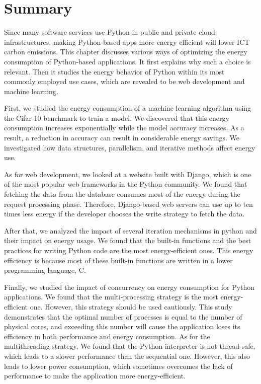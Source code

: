 \section{Summary}

Since many software services use Python in public and private cloud infrastructures, making Python-based apps more energy efficient will lower ICT carbon emissions.
This chapter discusses various ways of optimizing the energy consumption of Python-based applications. It first explains why such a choice is relevant. Then it studies the energy behavior of Python within its most commonly employed use cases, which are revealed to be web development and machine learning.

First, we studied the energy consumption of a machine learning algorithm using the Cifar-10 benchmark to train a model. We discovered that this energy consumption increases exponentially while the model accuracy increases.
As a result, a reduction in accuracy can result in considerable energy savings.
We investigated how data structures, parallelism, and iterative methods affect energy use.

As for web development, we looked at a website built with Django, which is one of the most popular web frameworks in the Python community. We found that fetching the data from the database consumes most of the energy during the request processing phase. Therefore, Django-based web servers can use up to ten times less energy if the developer chooses the write strategy to fetch the data.

After that, we analyzed the impact of several iteration mechanisms in python and their impact on energy usage. We found that the built-in functions and the best practices for writing Python code are the most energy-efficient ones. This energy efficiency is because most of these built-in functions are written in a lower programming language, C.


Finally, we studied the impact of concurrency on energy consumption for Python applications. We found that the multi-processing strategy is the most energy-efficient one. However, this strategy should be used cautiously. This study demonstrates that the optimal number of processes is equal to the number of physical cores, and exceeding this number will cause the application loses its efficiency in both performance and energy consumption. As for the multithreading strategy, We found that the Python interpreter is not thread-safe, which leads to a slower performance than the sequential one. However, this also leads to lower power consumption, which sometimes overcomes the lack of performance to make the application more energy-efficient.

